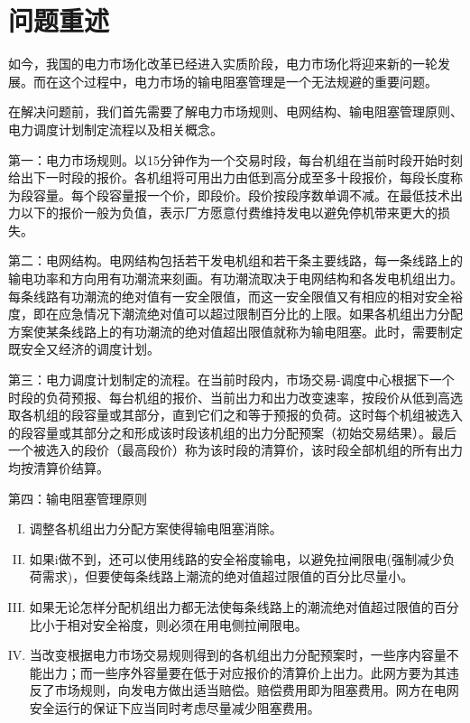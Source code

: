 \documentclass[12pt,a4paper]{ctexart}
\begin{document}
\newpage
\section{问题重述}
如今，我国的电力市场化改革已经进入实质阶段，电力市场化将迎来新的一轮发展。而在这个过程中，电力市场的输电阻塞管理是一个无法规避的重要问题。

在解决问题前，我们首先需要了解电力市场规则、电网结构、输电阻塞管理原则、电力调度计划制定流程以及相关概念。

第一：电力市场规则。以15分钟作为一个交易时段，每台机组在当前时段开始时刻给出下一时段的报价。各机组将可用出力由低到高分成至多十段报价，每段长度称为段容量。每个段容量报一个价，即段价。段价按段序数单调不减。在最低技术出力以下的报价一般为负值，表示厂方愿意付费维持发电以避免停机带来更大的损失。

第二：电网结构。电网结构包括若干发电机组和若干条主要线路，每一条线路上的输电功率和方向用有功潮流来刻画。有功潮流取决于电网结构和各发电机组出力。每条线路有功潮流的绝对值有一安全限值，而这一安全限值又有相应的相对安全裕度，即在应急情况下潮流绝对值可以超过限制百分比的上限。如果各机组出力分配方案使某条线路上的有功潮流的绝对值超出限值就称为输电阻塞。此时，需要制定既安全又经济的调度计划。
 
第三：电力调度计划制定的流程。在当前时段内，市场交易-调度中心根据下一个时段的负荷预报、每台机组的报价、当前出力和出力改变速率，按段价从低到高选取各机组的段容量或其部分，直到它们之和等于预报的负荷。这时每个机组被选入的段容量或其部分之和形成该时段该机组的出力分配预案（初始交易结果）。最后一个被选入的段价（最高段价）称为该时段的清算价，该时段全部机组的所有出力均按清算价结算。

第四：输电阻塞管理原则
\begin{enumerate}[I.]
	\item 调整各机组出力分配方案使得输电阻塞消除。
	
	\item 如果i做不到，还可以使用线路的安全裕度输电，以避免拉闸限电(强制减少负荷需求)，但要使每条线路上潮流的绝对值超过限值的百分比尽量小。
	
	\item 如果无论怎样分配机组出力都无法使每条线路上的潮流绝对值超过限值的百分比小于相对安全裕度，则必须在用电侧拉闸限电。
	
	\item 当改变根据电力市场交易规则得到的各机组出力分配预案时，一些序内容量不能出力；而一些序外容量要在低于对应报价的清算价上出力。此网方要为其违反了市场规则，向发电方做出适当赔偿。赔偿费用即为阻塞费用。网方在电网安全运行的保证下应当同时考虑尽量减少阻塞费用。
\end{enumerate}
\end{document}
